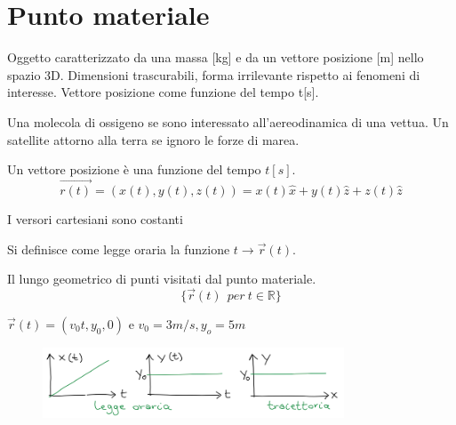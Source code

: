 \section{Punto materiale}
Oggetto caratterizzato da una massa [kg] e da un vettore posizione [m] nello spazio 3D.
Dimensioni trascurabili, forma irrilevante rispetto ai fenomeni di interesse.
Vettore posizione come funzione del tempo t[s].
\begin{example}
    Una molecola di ossigeno se sono interessato all'aereodinamica di una vettua. 
    Un satellite attorno alla terra se ignoro le forze di marea.
\end{example}
\hspace{-15pt}Un vettore posizione è una funzione del tempo $t[s]$.
$$\vec{r(t)} = (x(t), y(t), z(t)) = x(t)\hat{x} + y(t)\hat{z} + z(t)\hat{z}$$
\begin{observation}
    I versori cartesiani sono costanti
\end{observation}

\begin{definition}
    Si definisce come legge oraria la funzione $t \to \vec{r}(t)$.
\end{definition}

\begin{definition}[Traiettoria]
    Il lungo geometrico di punti visitati dal punto materiale.
    $$\{\vec{r}(t)\:\: per \: t \in \mathbb{R}\}$$
\end{definition}

\begin{example}
    $\vec{r}(t) = (v_0t, y_0, 0)$ e $v_0 = 3m/s, y_o = 5m$ 
    \begin{figure}[h!]
        \centering
        \includegraphics[width=0.8\textwidth]{images/ess-traiettoria.png}
    \end{figure}
\end{example}

